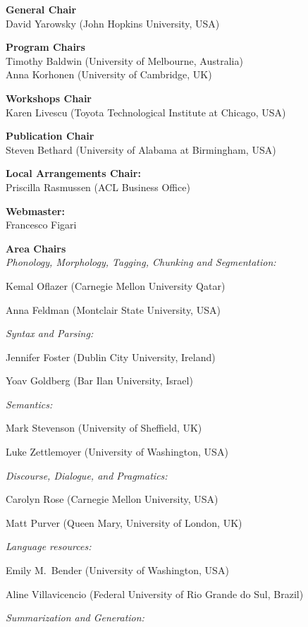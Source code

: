 {\small
\noindent
\textbf{General Chair}\\
David Yarowsky (John Hopkins University, USA)

\smallskip
\noindent
\textbf{Program Chairs}\\
Timothy Baldwin (University of Melbourne, Australia)\\
Anna Korhonen (University of Cambridge, UK)

\smallskip
\noindent
\textbf{Workshops Chair}\\
Karen Livescu (Toyota Technological Institute at Chicago, USA)

\smallskip
\noindent
\textbf{Publication Chair}\\
Steven Bethard (University of Alabama at Birmingham, USA)

\smallskip
\noindent
\textbf{Local Arrangements Chair:}\\
Priscilla Rasmussen (ACL Business Office)

\smallskip
\noindent
\textbf{Webmaster:}\\
Francesco Figari

\medskip
\noindent
\textbf{Area Chairs}\\
\textit{Phonology, Morphology, Tagging, Chunking and Segmentation:}

Kemal Oflazer (Carnegie Mellon University Qatar)

Anna Feldman (Montclair State University, USA)

\noindent
\textit{Syntax and Parsing:}

Jennifer Foster (Dublin City University, Ireland)

Yoav Goldberg (Bar Ilan University, Israel)

\noindent
\textit{Semantics:}

Mark Stevenson (University of Sheffield, UK)

Luke Zettlemoyer (University of Washington, USA)

\noindent
\textit{Discourse, Dialogue, and Pragmatics:}

Carolyn Rose (Carnegie Mellon University, USA)

Matt Purver (Queen Mary, University of London, UK)

\noindent
\textit{Language resources:}

Emily M.\ Bender (University of Washington, USA)

Aline Villavicencio (Federal University of Rio Grande do Sul, Brazil)

\noindent
\textit{Summarization and Generation:}

}
